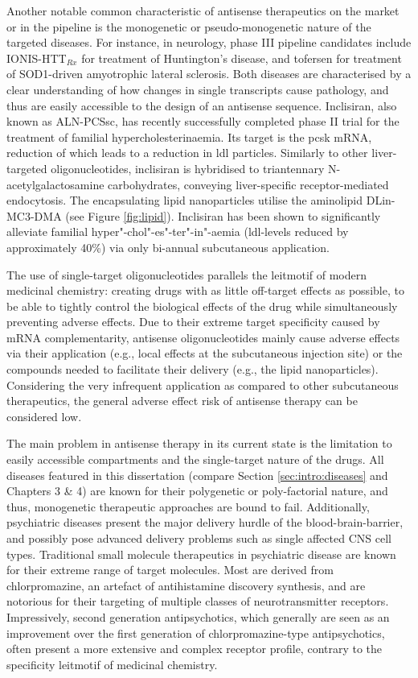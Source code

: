 Another notable common characteristic of antisense therapeutics on the market or in the pipeline is the monogenetic or pseudo-monogenetic nature of the targeted diseases. For instance, in neurology, phase III pipeline candidates include IONIS-HTT$_{Rx}$ for treatment of Huntington's disease, and tofersen for treatment of SOD1-driven amyotrophic lateral sclerosis. Both diseases are characterised by a clear understanding of how changes in single transcripts cause pathology, and thus are easily accessible to the design of an antisense sequence. Inclisiran, also known as ALN-PCSsc, has recently successfully completed phase II trial for the treatment of familial hypercholesterinaemia.\cite{Raal2020} Its target is the \ac{pcsk} mRNA, reduction of which leads to a reduction in \ac{ldl} particles. Similarly to other liver-targeted oligonucleotides, inclisiran is hybridised to triantennary N-acetylgalactosamine carbohydrates, conveying liver-specific receptor-mediated endocytosis. The encapsulating lipid nanoparticles utilise the aminolipid DLin-MC3-DMA (see Figure \ref{fig:lipid}).\cite{Jayaraman2012} Inclisiran has been shown to significantly alleviate familial hyper"-chol"-es"-ter"-in"-aemia (\ac{ldl}-levels reduced by approximately 40\%) via only bi-annual subcutaneous application.\cite{Frank-Kamenetsky2008, Fitzgerald2014, Fitzgerald2017, Raal2020}

The use of single-target oligonucleotides parallels the leitmotif of modern medicinal chemistry: creating drugs with as little off-target effects as possible, to be able to tightly control the biological effects of the drug while simultaneously preventing adverse effects. Due to their extreme target specificity caused by mRNA complementarity, antisense oligonucleotides mainly cause adverse effects via their application (e.g., local effects at the subcutaneous injection site) or the compounds needed to facilitate their delivery (e.g., the lipid nanoparticles). Considering the very infrequent application as compared to other subcutaneous therapeutics, the general adverse effect risk of antisense therapy can be considered low.\cite{Raal2020}

The main problem in antisense therapy in its current state is the limitation to easily accessible compartments and the single-target nature of the drugs. All diseases featured in this dissertation (compare Section \ref{sec:intro:diseases} and Chapters 3 \& 4) are known for their polygenetic or poly-factorial nature, and thus, monogenetic therapeutic approaches are bound to fail. Additionally, psychiatric diseases present the major delivery hurdle of the blood-brain-barrier, and possibly pose advanced delivery problems such as single affected CNS cell types. Traditional small molecule therapeutics in psychiatric disease are known for their extreme range of target molecules. Most are derived from chlorpromazine, an artefact of antihistamine discovery synthesis, and are notorious for their targeting of multiple classes of neurotransmitter receptors. Impressively, second generation antipsychotics, which generally are seen as an improvement over the first generation of chlorpromazine-type antipsychotics, often present a more extensive and complex receptor profile, contrary to the specificity leitmotif of medicinal chemistry.

